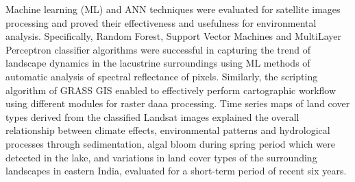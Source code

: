 \documentclass[jmse,article,submit,pdftex,moreauthors]{Definitions/mdpi}
\begin{document}
Machine learning (ML) and ANN techniques were evaluated for satellite images processing and proved their effectiveness and usefulness for environmental analysis. Specifically, Random Forest, Support Vector Machines and MultiLayer Perceptron classifier algorithms were successful in capturing the trend of landscape dynamics in the lacustrine surroundings using ML methods of automatic analysis of spectral reflectance of pixels. Similarly, the scripting algorithm of GRASS GIS enabled to effectively perform cartographic workflow using different modules for raster daaa processing. Time series maps of land cover types derived from the classified Landsat images explained the overall relationship between climate effects, environmental patterns and hydrological processes through sedimentation, algal bloom during spring period which were detected in the lake, and  variations in land cover types of the surrounding landscapes in eastern India, evaluated for a short-term period of recent six years.






\end{document}
